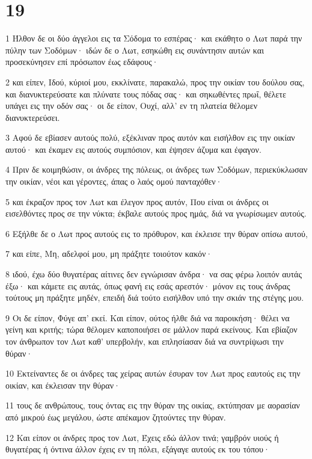 \chapter{19}

\par 1 Ήλθον δε οι δύο άγγελοι εις τα Σόδομα το εσπέρας· και εκάθητο ο Λωτ παρά την πύλην των Σοδόμων· ιδών δε ο Λωτ, εσηκώθη εις συνάντησιν αυτών και προσεκύνησεν επί πρόσωπον έως εδάφους·
\par 2 και είπεν, Ιδού, κύριοί μου, εκκλίνατε, παρακαλώ, προς την οικίαν του δούλου σας, και διανυκτερεύσατε και πλύνατε τους πόδας σας· και σηκωθέντες πρωΐ, θέλετε υπάγει εις την οδόν σας· οι δε είπον, Ουχί, αλλ' εν τη πλατεία θέλομεν διανυκτερεύσει.
\par 3 Αφού δε εβίασεν αυτούς πολύ, εξέκλιναν προς αυτόν και εισήλθον εις την οικίαν αυτού· και έκαμεν εις αυτούς συμπόσιον, και έψησεν άζυμα και έφαγον.
\par 4 Πριν δε κοιμηθώσιν, οι άνδρες της πόλεως, οι άνδρες των Σοδόμων, περιεκύκλωσαν την οικίαν, νέοι και γέροντες, άπας ο λαός ομού πανταχόθεν·
\par 5 και έκραζον προς τον Λωτ και έλεγον προς αυτόν, Που είναι οι άνδρες οι εισελθόντες προς σε την νύκτα; έκβαλε αυτούς προς ημάς, διά να γνωρίσωμεν αυτούς.
\par 6 Εξήλθε δε ο Λωτ προς αυτούς εις το πρόθυρον, και έκλεισε την θύραν οπίσω αυτού,
\par 7 και είπε, Μη, αδελφοί μου, μη πράξητε τοιούτον κακόν·
\par 8 ιδού, έχω δύο θυγατέρας αίτινες δεν εγνώρισαν άνδρα· να σας φέρω λοιπόν αυτάς έξω· και κάμετε εις αυτάς, όπως φανή εις εσάς αρεστόν· μόνον εις τους άνδρας τούτους μη πράξητε μηδέν, επειδή διά τούτο εισήλθον υπό την σκιάν της στέγης μου.
\par 9 Οι δε είπον, Φύγε απ' εκεί. Και είπον, ούτος ήλθε διά να παροικήση· θέλει να γείνη και κριτής; τώρα θέλομεν καποποιήσει σε μάλλον παρά εκείνους. Και εβίαζον τον άνθρωπον τον Λωτ καθ' υπερβολήν, και επλησίασαν διά να συντρίψωσι την θύραν·
\par 10 Εκτείναντες δε οι άνδρες τας χείρας αυτών έσυραν τον Λωτ προς εαυτούς εις την οικίαν, και έκλεισαν την θύραν·
\par 11 τους δε ανθρώπους, τους όντας εις την θύραν της οικίας, εκτύπησαν με αορασίαν από μικρού έως μεγάλου, ώστε απέκαμον ζητούντες την θύραν.
\par 12 Και είπον οι άνδρες προς τον Λωτ, Έχεις εδώ άλλον τινά; γαμβρόν υιούς ή θυγατέρας ή όντινα άλλον έχεις εν τη πόλει, εξάγαγε αυτούς εκ του τόπου·
